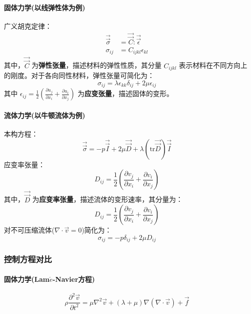 \begin{example}
    \paragraph{固体力学(以线弹性体为例)}
    广义胡克定律：
    \begin{align*}
        \vec{\vec{\sigma}} &= \vec{\vec{C}} : \vec{\vec{\epsilon}} \\
        \sigma_{ij} &= C_{ijkl} \epsilon_{kl}
    \end{align*}
    其中，$\vec{\vec{C}}$ 为\textbf{弹性张量}，描述材料的弹性性质，其分量 $C_{ijkl}$ 表示材料在不同方向上的刚度。对于各向同性材料，弹性张量可简化为：
\begin{equation*}
    \sigma_{ij} = \lambda \epsilon_{kk}\delta_{ij} + 2\mu \epsilon_{ij}
\end{equation*}
其中 $\epsilon_{ij} = \frac{1}{2}\left(\frac{\partial u_j}{\partial x_i} + \frac{\partial u_i}{\partial x_j}\right)$ 为\textbf{应变张量}，描述固体的变形。

    \paragraph{流体力学(以牛顿流体为例)}
    本构方程：
    \begin{equation*}
        \vec{\vec{\sigma}} = -p\vec{\vec{I}} + 2\mu \vec{\vec{D}} + \lambda (\text{tr}\vec{\vec{D}})\vec{\vec{I}}
    \end{equation*}
    应变率张量：
    \begin{equation*}
        D_{ij} = \frac{1}{2}\left(\frac{\partial v_j}{\partial x_i} + \frac{\partial v_i}{\partial x_j}\right)
    \end{equation*}
    其中，$\vec{\vec{D}}$ 为\textbf{应变率张量}，描述流体的变形速率，其分量为：
\begin{equation*}
    D_{ij} = \frac{1}{2}\left(\frac{\partial v_j}{\partial x_i} + \frac{\partial v_i}{\partial x_j}\right)
\end{equation*}
    对不可压缩流体($\nabla \cdot \vec{v}=0$)简化为：
    \begin{equation*}
        \sigma_{ij} = -p\delta_{ij} + 2\mu D_{ij}
    \end{equation*}
    
    \subsubsection{控制方程对比}
    \paragraph{固体力学(Lam$\acute{e}$-Navier方程)}
    \begin{equation*}
        \rho \frac{\partial^2 \vec{v}}{\partial t^2} = \mu \nabla^2 \vec{v} + (\lambda+\mu)\nabla(\nabla \cdot \vec{v}) + \vec{f}
    \end{equation*}
    

\end{example}
